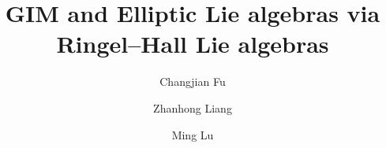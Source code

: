 \documentclass[12pt,reqno]{amsart}
\numberwithin{equation}{section}
\begin{document}
	\title[GIM and Elliptic Lie algebras via Ringel--Hall Lie algebras]{GIM and Elliptic Lie algebras via Ringel--Hall Lie algebras}
	
	\author[Changjian Fu]{Changjian Fu}
	
	\address{Changjian Fu\\Department of Mathematics, Sichuan University, 610064 Chengdu, P.R.China}
	\author[Zhanhong Liang]{Zhanhong Liang}
	\address{Zhanhong Liang\\ Department of Mathematics, Sichuan University, 610064 Chengdu, P.R.China}
	
	
	\author[Ming Lu]{Ming Lu}
	\address{Ming Lu\\Department of Mathematics, Sichuan University, 610064 Chengdu, P.R.China}
	
	
	
	\subjclass[2020]{Primary 17B37, %
		16E60, 18G80.}  %
	
	
\end{document}
